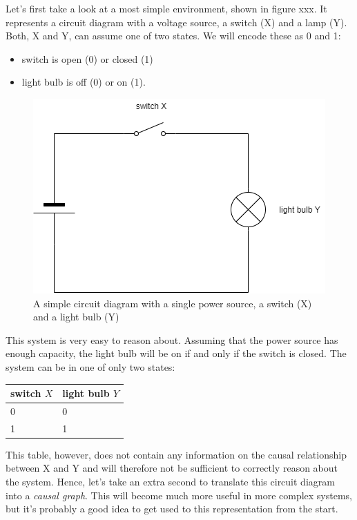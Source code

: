 \documentclass[
]{book}
\providecommand{\tightlist}{%
  \setlength{\itemsep}{0pt}\setlength{\parskip}{0pt}}
\theoremstyle{definition}
\theoremstyle{definition}
\theoremstyle{definition}
\theoremstyle{remark}
\begin{document}
Let's first take a look at a most simple environment, shown in figure xxx. It represents a circuit diagram with a voltage source, a switch (X) and a lamp (Y). Both, X and Y, can assume one of two states. We will encode these as 0 and 1:

\begin{itemize}
\tightlist
\item
  switch is open (0) or closed (1)
\item
  light bulb is off (0) or on (1).
\end{itemize}

\begin{figure}
\centering
\includegraphics{images/causal_models-simple_electric_1.png}
\caption{A simple circuit diagram with a single power source, a switch (X) and a light bulb (Y)}
\end{figure}

This system is very easy to reason about. Assuming that the power source has enough capacity, the light bulb will be on if and only if the switch is closed. The system can be in one of only two states:

\begin{longtable}[]{@{}ll@{}}
\toprule
switch \(X\) & light bulb \(Y\)\tabularnewline
\midrule
\endhead
0 & 0\tabularnewline
1 & 1\tabularnewline
\bottomrule
\end{longtable}

This table, however, does not contain any information on the causal relationship between X and Y and will therefore not be sufficient to correctly reason about the system. Hence, let's take an extra second to translate this circuit diagram into a \emph{causal graph}. This will become much more useful in more complex systems, but it's probably a good idea to get used to this representation from the start.
\end{document}
